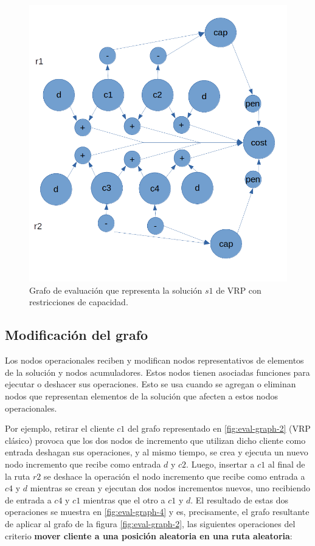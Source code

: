 \begin{figure}
	\centering
	\includegraphics[width=0.9\linewidth]{Graphics/eval-graph-3}
	\caption{Grafo de evaluación que representa la solución $s1$ de VRP con restricciones de capacidad.}
	\label{fig:eval-graph-3}
\end{figure}

\subsection{Modificación del grafo}

Los nodos operacionales reciben y modifican nodos representativos de elementos de la solución y nodos acumuladores. Estos nodos tienen asociadas funciones para ejecutar o deshacer sus operaciones. Esto se usa cuando se agregan o eliminan nodos que representan elementos de la solución que afecten a estos nodos operacionales. 

Por ejemplo, retirar el cliente $c1$ del grafo representado en \ref{fig:eval-graph-2} (VRP clásico) provoca que los dos nodos de incremento que utilizan dicho cliente como entrada deshagan sus operaciones, y al mismo tiempo, se crea y ejecuta un nuevo nodo incremento que recibe como entrada $d$ y $c2$. Luego, insertar a $c1$ al final de la ruta $r2$ se deshace la operación el nodo incremento que recibe como entrada a $c4$ y $d$ mientras se crean y ejecutan dos nodos incrementos nuevos, uno recibiendo de entrada a $c4$ y $c1$ mientras que el otro a $c1$ y $d$. El resultado de estas dos operaciones se muestra en \ref{fig:eval-graph-4} y es, precisamente, el grafo resultante de aplicar al grafo de la figura \ref{fig:eval-graph-2}, las siguientes operaciones del criterio \textbf{mover cliente a una posición aleatoria en una ruta aleatoria}:

